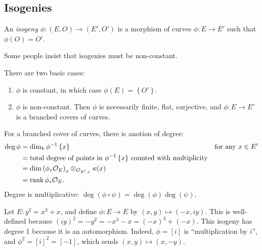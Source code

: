\subsection{Isogenies}
\begin{definition}
  An \textit{isogeny} \( \phi \colon \left( E,O \right) \to \left( E',O' \right) \) is a morphism of curves \( \phi \colon E \to E' \) such that \( \phi(O) = O' \).
\end{definition}
\begin{remark}
  Some people insist that isogenies must be non-constant.
\end{remark}
There are two basic cases:
\begin{enumerate}
\item \( \phi \) is constant, in which case \( \phi(E) = \left\lbrace O' \right\rbrace \).
\item \( \phi \) is non-constant. Then \( \phi \) is necessarily finite, flat, surjective, and \( \phi \colon E \to E' \) is a branched covers of curves.
\end{enumerate}
For a branched cover of curves, there is anotion of degree:
\begin{align*}
  \operatorname{deg} \phi & = \operatorname{dim}_k \phi^{-1} \left\lbrace x \right\rbrace & \text{for any } x \in E' \\
                          & = \text{total degree of points in \( \phi^{-1} \left\lbrace x \right\rbrace \) counted with multiplicity} & \\
                          & = \operatorname{dim} \left( \phi_* \mathcal{O}_E \right)_x \otimes_{\mathcal{O}_{E',x}} \kappa(x) & \\
                          & = \operatorname{rank} \phi_* \mathcal{O}_E . &
\end{align*}
Degree is multiplicative: \( \operatorname{deg} \left( \phi \circ \psi \right) = \operatorname{deg}(\phi) \operatorname{deg}(\psi) \).
\begin{example}
  Let \( E: y^2 = x^3 + x \), and define \( \phi \colon E \to E \) by \( (x,y) \mapsto (-x,iy) \).
  This is well-defined because \( (iy)^2 = - y^2 = -x^3 - x = (-x)^3 + (-x) \).
  This isogeny has degree 1 because it is an automorphism.
  Indeed, \( \phi = [i] \) is ``multiplication by \( i \)'', and \( \phi^2 = [i]^2 = [-1] \), which sends \( (x,y) \mapsto (x,-y) \).
\end{example}
